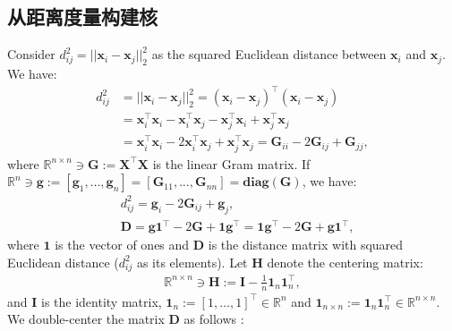 \documentclass[lang=cn,10pt]{gorgeousnbook}
\numberwithin{equation}{section}%
\numberwithin{figure}{section}%
\begin{document}
\subsection{从距离度量构建核}

Consider $d_{ij}^2 = ||\boldsymbol{x}_i - \boldsymbol{x}_j||_2^2$ as the squared Euclidean distance between $\boldsymbol{x}_i$ and $\boldsymbol{x}_j$. We have:
\begin{align*}
d_{ij}^2 &= ||\boldsymbol{x}_i - \boldsymbol{x}_j||_2^2 = (\boldsymbol{x}_i - \boldsymbol{x}_j)^\top (\boldsymbol{x}_i - \boldsymbol{x}_j) \\
&= \boldsymbol{x}_i^\top \boldsymbol{x}_i - \boldsymbol{x}_i^\top \boldsymbol{x}_j - \boldsymbol{x}_j^\top \boldsymbol{x}_i + \boldsymbol{x}_j^\top \boldsymbol{x}_j \\
&= \boldsymbol{x}_i^\top \boldsymbol{x}_i - 2\boldsymbol{x}_i^\top \boldsymbol{x}_j + \boldsymbol{x}_j^\top \boldsymbol{x}_j = \boldsymbol{G}_{ii} - 2 \boldsymbol{G}_{ij} + \boldsymbol{G}_{jj},
\end{align*}
where $\mathbb{R}^{n \times n} \ni \boldsymbol{G} := \boldsymbol{X}^\top \boldsymbol{X}$ is the linear Gram matrix. If $\mathbb{R}^n \ni \boldsymbol{g} := [\boldsymbol{g}_1, \dots, \boldsymbol{g}_n] = [\boldsymbol{G}_{11}, \dots, \boldsymbol{G}_{nn}] = \textbf{diag}(\boldsymbol{G})$, we have:
\begin{align*}
& d_{ij}^2 = \boldsymbol{g}_i -2\boldsymbol{G}_{ij} + \boldsymbol{g}_j, \\
& \boldsymbol{D} = \boldsymbol{g}\boldsymbol{1}^\top -2 \boldsymbol{G} +\boldsymbol{1}\boldsymbol{g}^\top = \boldsymbol{1}\boldsymbol{g}^\top -2 \boldsymbol{G} + \boldsymbol{g}\boldsymbol{1}^\top,
\end{align*}
where $\boldsymbol{1}$ is the vector of ones and $\boldsymbol{D}$ is the distance matrix with squared Euclidean distance ($d_{ij}^2$ as its elements). 
Let $\boldsymbol{H}$ denote the centering matrix:
\begin{align}\label{equation_centered_matrix}
\mathbb{R}^{n \times n} \ni \boldsymbol{H} := \boldsymbol{I} - \frac{1}{n} \boldsymbol{1}_n\boldsymbol{1}_n^\top,
\end{align}
and $\boldsymbol{I}$ is the identity matrix, $\boldsymbol{1}_n := [1, \dots, 1]^\top \in \mathbb{R}^n$ and $\boldsymbol{1}_{n \times n} := \boldsymbol{1}_n \boldsymbol{1}_n^\top \in \mathbb{R}^{n \times n}$. 
 We double-center the matrix $\boldsymbol{D}$ as follows \cite{oldford2018lecture}:
\end{document}
